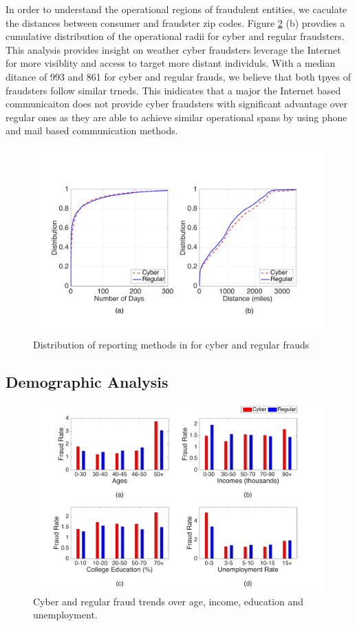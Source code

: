 \documentclass[conference]{IEEEtran}
\begin{document}
In order to understand the operational regions of fraudulent entities, we caculate the distances between consumer and fraudster zip codes. Figure \ref{reportingfig} (b) provdies a cumulative distribution of the operational radii for cyber and regular fraudsters.  This analysis provides insight on weather cyber fraudsters leverage the Internet for more visiblity and access to target more distant individuls. With a median ditance of 993 and 861 for cyber and regular frauds, we believe that both tpyes of fraudsters follow similar trneds. This inidicates that a major the Internet based communicaiton does not provide cyber fraudsters with significant advantage over regular ones as they are able to achieve similar operational spans by using phone and mail based communication methods.

\begin{figure}[t]
\centering
  \includegraphics[scale=0.28]{graphics/dist_days.pdf}
  \caption{Distribution of reporting methods in for cyber and regular frauds}
  \label{reportingfig}
\end{figure}


\subsection{Demographic Analysis}\label{fraudsters}

\begin{figure}[t]
\centering
  \includegraphics[scale=0.28]{graphics/demographics.pdf}
  \caption{Cyber and regular fraud trends over age, income, education and unemployment.}
  \label{reportingfig}
\end{figure}
\end{document}
